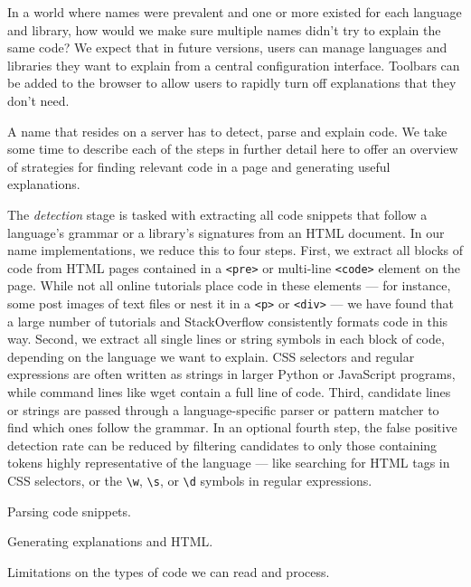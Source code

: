 In a world where \glspl{name} were prevalent and one or more existed for each language and library, how would we make sure multiple \glspl{name} didn't try to explain the same code?
We expect that in future versions, users can manage languages and libraries they want to explain from a central configuration interface.
Toolbars can be added to the browser to allow users to rapidly turn off explanations that they don't need.

A \gls{name} that resides on a server has to detect, parse and explain code.
We take some time to describe each of the steps in further detail here to offer an overview of strategies for finding relevant code in a page and generating useful explanations.

The \emph{detection} stage is tasked with extracting all code snippets that follow a language's grammar or a library's signatures from an HTML document.
In our \gls{name} implementations, we reduce this to four steps.
First, we extract all blocks of code from HTML pages contained in a \texttt{<pre>} or multi-line \texttt{<code>} element on the page.
While not all online tutorials place code in these elements --- for instance, some post images of text files or nest it in a \texttt{<p>} or \texttt{<div>} --- we have found that a large number of tutorials and StackOverflow consistently formats code in this way.
Second, we extract all single lines or string symbols in each block of code, depending on the language we want to explain.
CSS selectors and regular expressions are often written as strings in larger Python or JavaScript programs, while command lines like wget contain a full line of code.
Third, candidate lines or strings are passed through a language-specific parser or pattern matcher to find which ones follow the grammar.
In an optional fourth step, the false positive detection rate can be reduced by filtering candidates to only those containing tokens highly representative of the language --- like searching for HTML tags in CSS selectors, or the \texttt{\textbackslash{}w}, \texttt{\textbackslash{}s}, or \texttt{\textbackslash{}d} symbols in regular expressions.

Parsing code snippets.

Generating explanations and HTML.

Limitations on the types of code we can read and process.
